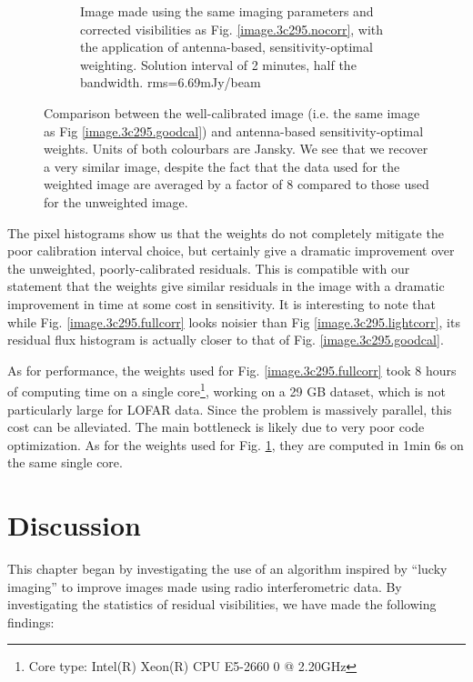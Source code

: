 \begin{figure}[h!]
\begin{subfigure}{.49\textwidth}
\caption{\label{image.3c295.antcorr} Image made using the same imaging parameters and corrected visibilities as Fig. \ref{image.3c295.nocorr}, with the application of antenna-based, sensitivity-optimal weighting. Solution interval of 2 minutes, half the bandwidth. rms=6.69mJy/beam}
\end{subfigure}
\caption{\label{image.twoRealImages}Comparison between the well-calibrated image (i.e. the same image as Fig \ref*{image.3c295.goodcal}) and antenna-based sensitivity-optimal weights.  {Units of both colourbars are Jansky}. We see that we recover a very similar image, despite the fact that the data used for the weighted image are averaged by a factor of 8 compared to those used for the unweighted image.}
\end{figure}

\pg
{The pixel histograms show us that the weights do not completely mitigate the poor calibration interval choice, but certainly give a dramatic improvement over the unweighted, poorly-calibrated residuals. This is compatible with our statement that the weights give similar residuals in the image with a dramatic improvement in time at some cost in sensitivity. It is interesting to note that while Fig. \ref{image.3c295.fullcorr} looks noisier than Fig \ref{image.3c295.lightcorr}, its residual flux histogram is actually closer to that of Fig. \ref{image.3c295.goodcal}.}

\pg
As for performance, the weights used for Fig. \ref*{image.3c295.fullcorr} took 8 hours of computing time on a single core\footnote{Core type: Intel(R) Xeon(R) CPU E5-2660 0 @ 2.20GHz}, working on a 29 GB dataset, which is not particularly large for LOFAR data. Since the problem is massively parallel, this cost can be alleviated. The main bottleneck is likely due to very poor code optimization. As for the weights used for Fig. \ref*{image.3c295.antcorr}, they are computed in 1min 6s on the same single core. 


\section{Discussion}

This chapter began by investigating the use of an algorithm inspired by ``lucky imaging'' to improve images made using radio interferometric data. By investigating the statistics of residual visibilities, we have made the following findings:

